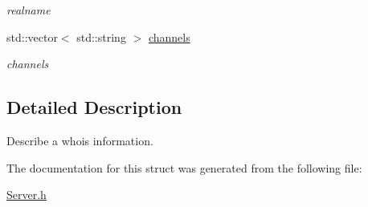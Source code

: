 \begin{DoxyCompactItemize}
\begin{DoxyCompactList}\small\item\em realname \end{DoxyCompactList}\item 
\hypertarget{a00036_a6433c6e8a2d096ac06bbce4267e6d24e}{std\-::vector$<$ std\-::string $>$ \hyperlink{a00036_a6433c6e8a2d096ac06bbce4267e6d24e}{channels}}\label{a00036_a6433c6e8a2d096ac06bbce4267e6d24e}

\begin{DoxyCompactList}\small\item\em channels \end{DoxyCompactList}\end{DoxyCompactItemize}


\subsection{Detailed Description}
Describe a whois information. 

The documentation for this struct was generated from the following file\-:\begin{DoxyCompactItemize}
\item 
\hyperlink{a00125}{Server.\-h}\end{DoxyCompactItemize}
